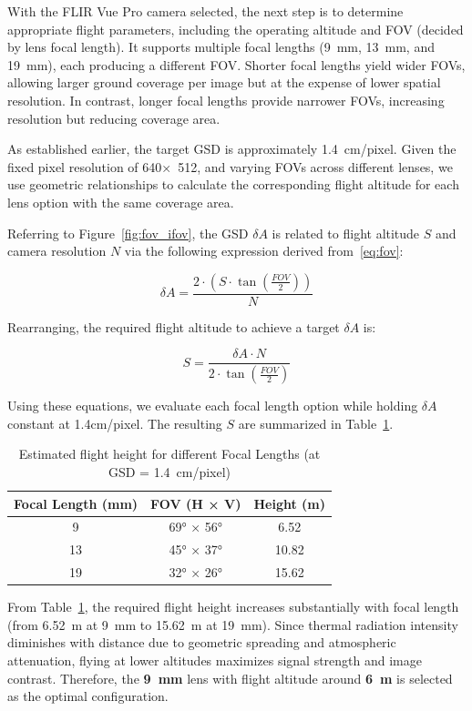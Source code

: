 With the FLIR Vue Pro camera selected, the next step is to determine appropriate flight parameters, including the operating altitude and FOV (decided by lens focal length). It supports multiple focal lengths (9~mm, 13~mm, and 19~mm), each producing a different FOV. Shorter focal lengths yield wider FOVs, allowing larger ground coverage per image but at the expense of lower spatial resolution. In contrast, longer focal lengths provide narrower FOVs, increasing resolution but reducing coverage area.

As established earlier, the target GSD is approximately 1.4~cm/pixel. Given the fixed pixel resolution of 640×~512, and varying FOVs across different lenses, we use geometric relationships to calculate the corresponding flight altitude for each lens option with the same coverage area.

Referring to Figure~\ref{fig:fov_ifov}, the GSD \( \delta A \) is related to flight altitude \( S \) and camera resolution \( N \) via the following expression derived from~\ref{eq:fov}:

\begin{equation}
\delta A = \frac{2 \cdot (S \cdot \tan(\frac{FOV}{2}))}{N}
\end{equation}

Rearranging, the required flight altitude to achieve a target \( \delta A \)  is:

\begin{equation}
S = \frac{\delta A \cdot N}{2 \cdot \tan(\frac{FOV}{2})}
\end{equation}

Using these equations, we evaluate each focal length option while holding \( \delta A \)  constant at 1.4cm/pixel. The resulting \( S \) are summarized in Table~\ref{tab:fov_results}.

\begin{table}[H]
\small
\centering
\caption{Estimated flight height for different Focal Lengths (at GSD = 1.4~cm/pixel)}
\label{tab:fov_results}
\begin{tabular}{|c|c|c|}
\hline
\textbf{Focal Length (mm)} & \textbf{FOV (H × V)} & \textbf{Height (m)} \\
\hline
9  & 69° × 56° & 6.52   \\
\hline
13 & 45° × 37° & 10.82  \\
\hline
19 & 32° × 26° & 15.62  \\
\hline
\end{tabular}
\end{table}

From Table~\ref{tab:fov_results}, the required flight height increases substantially with focal length (from 6.52~m at 9~mm to 15.62~m at 19~mm). Since thermal radiation intensity diminishes with distance due to geometric spreading and atmospheric attenuation, flying at lower altitudes maximizes signal strength and image contrast. Therefore, the \textbf{9~mm} lens with flight altitude around \textbf{6~m} is selected as the optimal configuration.